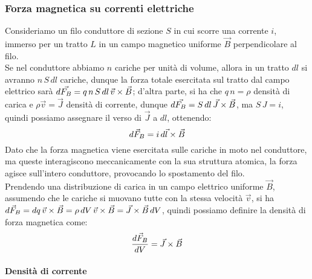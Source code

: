 \subsubsection{Forza magnetica su correnti elettriche}

Consideriamo un filo conduttore di sezione $ S $ in cui scorre una corrente $ i $, immerso per un tratto $ L $ in un campo magnetico uniforme $ \vec{B} $ perpendicolare al filo. \\ 
%
Se nel conduttore abbiamo $ n $ cariche per unità di volume, allora in un tratto $ dl $  si avranno $ n \, S \, dl $ cariche, dunque la forza totale esercitata sul tratto dal campo elettrico sarà $ d\vec{F_B} = q \, n \, S \, dl \, \vec{v}\times\vec{B} $; d'altra parte, si ha che $ q \, n = \rho $ densità di carica e $ \rho \vec{v} = \vec{J} $ densità di corrente, dunque $ d\vec{F_B} = S \, dl \, \vec{J}\times\vec{B} $, ma $ S \, J = i $, quindi possiamo assegnare il verso di $ \vec{J} $ a $ dl $, ottenendo:
\begin{equation}
	d\vec{F}_B = i \, d\vec{l}\times\vec{B}
	\label{eq:forza-filo}
\end{equation}
Dato che la forza magnetica viene esercitata sulle cariche in moto nel conduttore, ma queste interagiscono meccanicamente con la sua struttura atomica, la forza agisce sull'intero conduttore, provocando lo spostamento del filo. \\ 
%
Prendendo una distribuzione di carica in un campo elettrico uniforme $ \vec{B} $, assumendo che le cariche si muovano tutte con la stessa velocità $ \vec{v} $, si ha $ d\vec{F}_B = dq \, \vec{v}\times\vec{B} = \rho \, dV \, \vec{v}\times\vec{B} = \vec{J}\times\vec{B} \, dV $, quindi possiamo definire la densità di forza magnetica come:
\begin{equation}
	\displaystyle\frac{d\vec{F}_B}{dV} = \vec{J}\times\vec{B}
	\label{eq:dens-f-mag}
\end{equation}

\paragraph{Densità di corrente}

